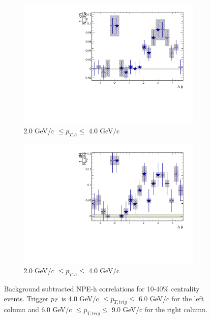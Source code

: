 \begin{figure}[htbp]
\begin{subfigure}{0.5\textwidth}
		\includegraphics[width=\textwidth]{Plots/Correlations/subtracted/NPE_eh_corr_subtracted_primpt_4_5_cent_4_6_assopt_3_4.pdf}
		\caption{2.0 GeV/c $\leq p_{T,h} \leq$ 4.0 GeV/c}
		\label{fig:Sub2040e}
	\end{subfigure}	
	\begin{subfigure}{0.5\textwidth}
		\includegraphics[width=\textwidth]{Plots/Correlations/subtracted/NPE_eh_corr_subtracted_primpt_6_8_cent_4_6_assopt_3_4.pdf}
		\caption{2.0 GeV/c $\leq p_{T,h} \leq$ 4.0 GeV/c}
		\label{fig:Sub2040f}
	\end{subfigure}	
\caption[Subtracted Correlations 10-40\% Centrality]{Background subtracted NPE-h correlations for 10-40\% centrality events. Trigger $p_{T}$ is 4.0 GeV/c $\leq p_{T,trig} \leq$ 6.0 GeV/c for the left column and 6.0 GeV/c $\leq p_{T,trig} \leq$ 9.0 GeV/c for the right column.}
\label{fig:Sub2040}
\end{figure}

